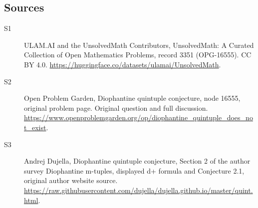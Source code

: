 \documentclass[11pt]{article}
\begin{document}
\subsection{Sources}
\begin{description}
\item[\hypertarget{source:3351:1}{S1}] ULAM.AI and the UnsolvedMath Contributors, UnsolvedMath: A Curated Collection of Open Mathematics Problems, record 3351 (OPG-16555). CC BY 4.0. \url{https://huggingface.co/datasets/ulamai/UnsolvedMath}.
\item[\hypertarget{source:3351:2}{S2}] Open Problem Garden, Diophantine quintuple conjecture, node 16555, original problem page. Original question and full discussion. \url{https://www.openproblemgarden.org/op/diophantine_quintuple_does_not_exist}.
\item[\hypertarget{source:3351:3}{S3}] Andrej Dujella, Diophantine quintuple conjecture, Section 2 of the author survey Diophantine m-tuples, displayed d+ formula and Conjecture 2.1, original author website source. \url{https://raw.githubusercontent.com/dujella/dujella.github.io/master/quint.html}.
\end{description}
\label{end:3351}
\end{document}
